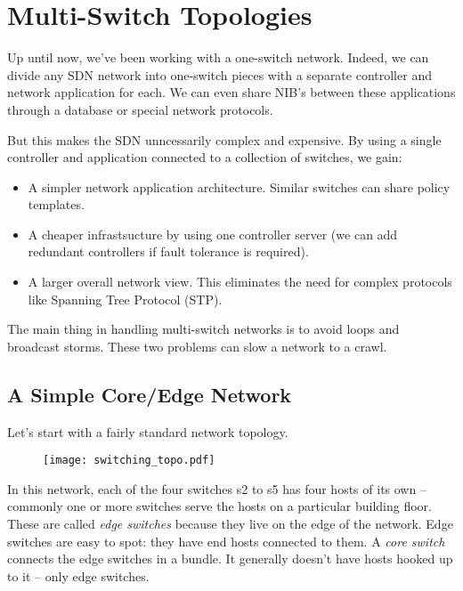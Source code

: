 
\chapter{Multi-Switch Topologies}
\label{chapter:multiswitch_topologies}

Up until now, we've been working with a one-switch network.  Indeed, we can divide any SDN network into
one-switch pieces with a separate controller and network application for each.  We can even share
NIB's between these applications through a database or special network protocols.  

But this makes the SDN unncessarily complex and expensive.  By using a single controller and application
connected to a collection of switches, we gain:

\begin{itemize}
\item A simpler network application architecture.  Similar switches can share policy templates.
\item A cheaper infrastsucture by using one controller server (we can add redundant controllers if
fault tolerance is required).
\item A larger overall network view.  This eliminates the need for complex protocols like Spanning
Tree Protocol (STP).
\end{itemize}

The main thing in handling multi-switch networks is to avoid loops and broadcast storms.  These two 
problems can slow a network to a crawl.   

\section{A Simple Core/Edge Network}

Let's start with a fairly standard network topology.  

\begin{figure}[h]
\centering
\texttt{[image: switching\_topo.pdf]}
\end{figure}

In this network, each of the four switches s2 to s5
has four hosts of its own -- commonly one or more switches serve the hosts on a particular building floor.
These are called \emph{edge switches} because they live on the edge of the network.  Edge switches are easy to 
spot: they have end hosts connected to them.
A \emph{core switch} connects the edge switches in a bundle.  It generally doesn't have hosts
hooked up to it -- only edge switches.  


